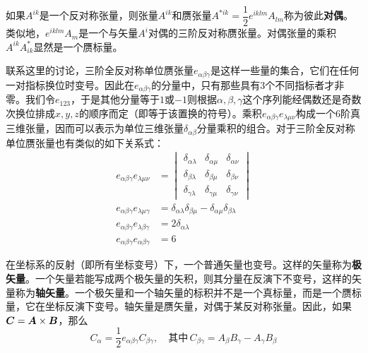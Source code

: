 如果$A^{ik}$是一个反对称张量，则张量$A^{ik}$和赝张量$A^{*ik} = \dfrac12 e^{iklm}A_{lm}$称为彼此{\bf 对偶}。类似地，$e^{iklm}A_m$是一个与矢量$A^i$对偶的三阶反对称赝张量。对偶张量的乘积$A^{ik}A^*_{ik}$显然是一个赝标量。

联系这里的讨论，三阶全反对称单位赝张量$e_{\alpha\beta\gamma}$是这样一些量的集合，它们在任何一对指标换位时变号。因此在$e_{\alpha\beta\gamma}$的分量中，只有那些具有3个不同指标者才非零。我们令$e_{123}$，于是其他分量等于$1$或$-1$则根据$\alpha,\beta,\gamma$这个序列能经偶数还是奇数次换位排成$x,y,z$的顺序而定（即等于该置换的符号）。乘积$e_{\alpha\beta\gamma}e_{\lambda\mu\nu}$构成一个6阶真三维张量，因而可以表示为单位三维张量$\delta_{\alpha\beta}$分量乘积的组合。对于三阶全反对称单位赝张量也有类似的如下关系式：
\begin{align}
	e_{\alpha\beta\gamma}e_{\lambda\mu\nu} & = \begin{vmatrix} \delta_{\alpha\lambda} & \delta_{\alpha\mu} & \delta_{\alpha\nu} \\ \delta_{\beta\lambda} & \delta_{\beta\mu} & \delta_{\beta\nu} \\ \delta_{\gamma\lambda} & \delta_{\gamma\mu} & \delta_{\gamma\nu} \end{vmatrix} \\
	e_{\alpha\beta\gamma}e_{\lambda\mu\gamma} & = \delta_{\alpha\lambda}\delta_{\beta\mu} - \delta_{\alpha\mu}\delta_{\beta\lambda} \\
	e_{\alpha\beta\gamma}e_{\lambda\beta\gamma} & = 2\delta_{\alpha\lambda} \\
	e_{\alpha\beta\gamma}e_{\alpha\beta\gamma} & = 6
\end{align}

在坐标系的反射（即所有坐标变号）下，一个普通矢量也变号。这样的矢量称为{\bf 极矢量}。一个矢量若能写成两个极矢量的矢积，则其分量在反演下不变号，这样的矢量称为{\bf 轴矢量}。一个极矢量和一个轴矢量的标积并不是一个真标量，而是一个赝标量，它在坐标反演下变号。轴矢量是赝矢量，对偶于某反对称张量。因此，如果$\boldsymbol{C} = \boldsymbol{A} \times \boldsymbol{B}$，那么
\begin{equation*}
	C_\alpha = \frac12 e_{\alpha\beta\gamma}C_{\beta\gamma},\quad \text{其中}\,C_{\beta\gamma} = A_\beta B_\gamma - A_\gamma B_\beta
\end{equation*}

